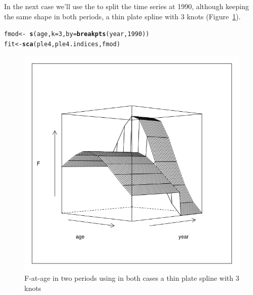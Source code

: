 \documentclass[a4paper,english,10pt]{article}\usepackage[]{graphicx}\usepackage[]{color}
\makeatletter
\def\maxwidth{ %
  \ifdim\Gin@nat@width>\linewidth
    \linewidth
  \else
    \Gin@nat@width
  \fi
}
\newcommand{\hlnum}[1]{\textcolor[rgb]{0.686,0.059,0.569}{#1}}%
\newcommand{\hlopt}[1]{\textcolor[rgb]{0,0,0}{#1}}%
\newcommand{\hlstd}[1]{\textcolor[rgb]{0.345,0.345,0.345}{#1}}%
\newcommand{\hlkwb}[1]{\textcolor[rgb]{0.69,0.353,0.396}{#1}}%
\newcommand{\hlkwc}[1]{\textcolor[rgb]{0.333,0.667,0.333}{#1}}%
\newcommand{\hlkwd}[1]{\textcolor[rgb]{0.737,0.353,0.396}{\textbf{#1}}}%
\newenvironment{kframe}{%
 \def\at@end@of@kframe{}%
 \ifinner\ifhmode%
  \def\at@end@of@kframe{\end{minipage}}%
  \begin{minipage}{\columnwidth}%
 \fi\fi%
 \def\FrameCommand##1{\hskip\@totalleftmargin \hskip-\fboxsep
 \colorbox{shadecolor}{##1}\hskip-\fboxsep
     \hskip-\linewidth \hskip-\@totalleftmargin \hskip\columnwidth}%
 \MakeFramed {\advance\hsize-\width
   \@totalleftmargin\z@ \linewidth\hsize
   \@setminipage}}%
 {\par\unskip\endMakeFramed%
 \at@end@of@kframe}
\newenvironment{knitrout}{}{} %
\makeatother
\begin{document}
In the next case we'll use the  to split the time series at 1990, although keeping the same shape in both periods, a thin plate spline with 3 knots (Figure~\ref{fig:brk}).

\begin{knitrout}
\color{fgcolor}\begin{kframe}
\begin{alltt}
\hlstd{fmod} \hlkwb{<-} \hlopt{~}\hlkwd{s}\hlstd{(age,} \hlkwc{k} \hlstd{=} \hlnum{3}\hlstd{,} \hlkwc{by} \hlstd{=} \hlkwd{breakpts}\hlstd{(year,} \hlnum{1990}\hlstd{))}
\hlstd{fit} \hlkwb{<-} \hlkwd{sca}\hlstd{(ple4, ple4.indices, fmod)}
\end{alltt}
\end{kframe}
\end{knitrout}

\begin{knitrout}
\color{fgcolor}\begin{figure}[H]

{\centering \includegraphics[width=\maxwidth]{figure/brk-1} 

}

\caption[F-at-age in two periods using in both cases a thin plate spline with 3 knots]{F-at-age in two periods using in both cases a thin plate spline with 3 knots}\label{fig:brk}
\end{figure}


\end{knitrout}
\end{document}
